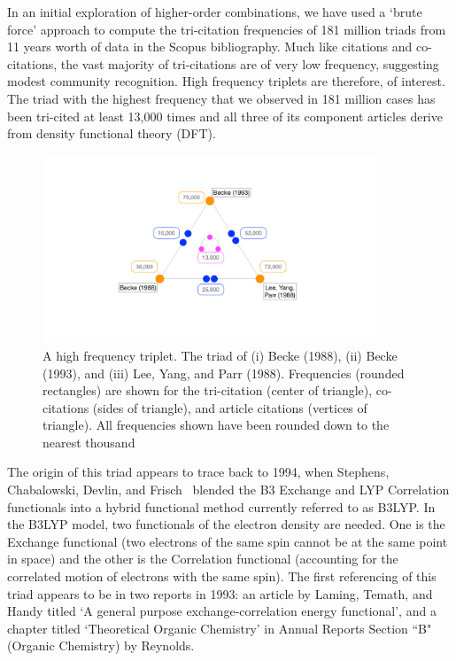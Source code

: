 \documentclass[journal=jcdis8,manuscript=article]{achemso}
\begin{document}
In an initial exploration of higher-order combinations, we have used a `brute force' approach to compute the tri-citation frequencies of 181 million triads from 11 years worth of data in the Scopus bibliography.  Much like citations and co-citations, the vast majority of tri-citations are of very low frequency, suggesting modest community recognition. High frequency triplets are therefore, of interest. The triad with the highest frequency that we observed in 181 million cases has been tri-cited at least 13,000 times and all three of its component articles derive from density functional theory (DFT). 
\begin{figure}[h!]
\begin{center}
\includegraphics[width=10cm]{fig1_tricite.pdf}%
\end{center}
\caption{A high frequency triplet. The triad of (i) Becke (1988), (ii) Becke (1993), and (iii) Lee, Yang, and Parr (1988).  Frequencies (rounded rectangles) are shown for the tri-citation (center of triangle), co-citations (sides of triangle), and article citations (vertices of triangle). All frequencies shown have been rounded down to the nearest thousand
}
\label{fig:fig1}
\end{figure}

The origin of this triad appears to trace back to 1994, when Stephens, Chabalowski, Devlin, and Frisch~\citep{stephens1994ab} blended the B3 Exchange and LYP Correlation functionals into a hybrid functional method currently  referred to as B3LYP.  In the B3LYP model, two functionals of the electron density are needed. One is the Exchange functional (two electrons of the same spin cannot be at the same point in space) and the other is the Correlation functional (accounting for the correlated motion of electrons with the same spin). The first referencing of this triad appears to be in two reports in 1993: an article by Laming, Temath, and Handy\citep{laming1993} titled `A general purpose exchange‐correlation energy functional', and a chapter titled `Theoretical Organic Chemistry' in Annual Reports Section ``B" (Organic Chemistry) by Reynolds\citep{reynolds1993theoretical}.
\end{document}
